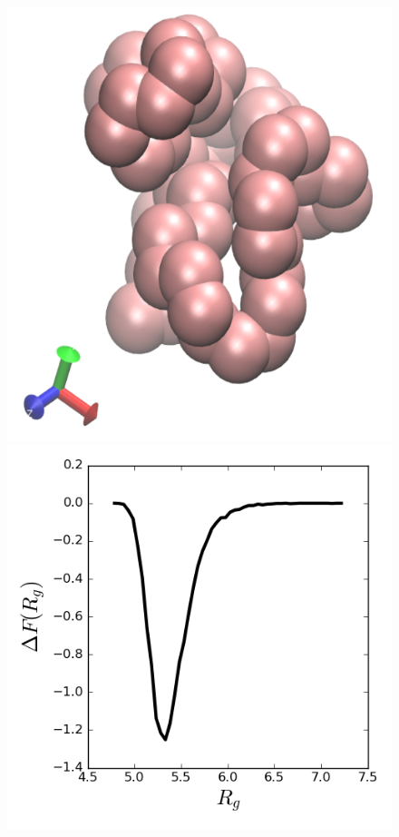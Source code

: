 \documentclass[12pt,letterpaper]{article}
\begin{document}
\begin{figure}[h!]
\centering
\includegraphics[scale=0.4]{artwork/c60.png}
\includegraphics[scale=0.4]{artwork/c60_wca_serial.png}

\end{figure}
\end{document}
